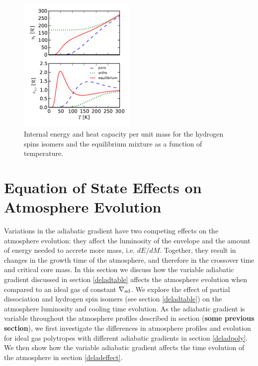 \documentclass[apj]{emulateapj}
\newcommand{\delad}{\nabla_{\rm ad}}
\begin{document}
\begin{figure}[h]
\centering
\includegraphics[width=0.5\textwidth]{../../figs/ModelAtmospheres/RadSelfGravRealEOS/EOSeffects/ortho_para_energy.pdf}
\caption{Internal energy and heat capacity per unit mass for the hydrogen spins isomers and the equilibrium mixture as a function of temperature.}
\label{fig:ucvr}
\end{figure}




\section{Equation of State Effects on Atmosphere Evolution}
\label{EOSeffects}

Variations in the adiabatic gradient have two competing effects on the atmosphere evolution: they affect the luminosity of the envelope and the amount of energy needed to accrete more mass, i.e. $dE/dM$. Together, they result in changes in the growth time of the atmosphere, and therefore in the crossover time and critical core mass. In this section we discuss how the variable adiabatic gradient discussed in section \ref{deladtable} affects the atmosphere evolution when compared to an ideal gas of constant $\delad$. We explore the effect of partial dissociation and hydrogen spin isomers (see section \ref{deladtable}) on the atmosphere luminosity and cooling time evolution. As the adiabatic gradient is variable throughout the atmosphere profiles described in section (\textbf{some previous section}), we first investigate the differences in atmosphere profiles and evolution for ideal gas polytropes with different adiabatic gradients in section \ref{deladpoly}. We then show how the variable adiabatic gradient affects the time evolution of the atmosphere in section \ref{deladeffect}.
\end{document}
